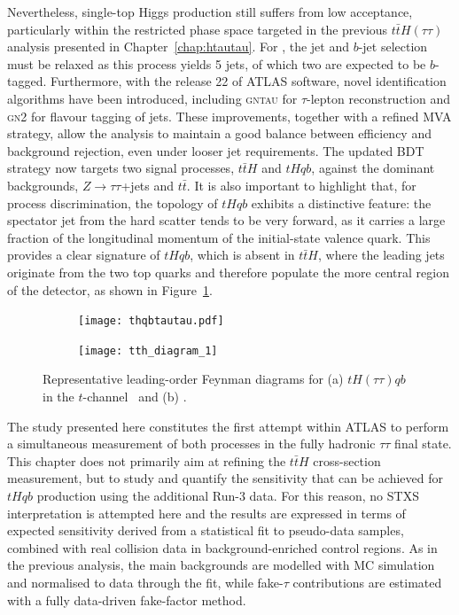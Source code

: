 Nevertheless, single-top Higgs production still suffers from low acceptance, particularly within the restricted phase space targeted in the previous $t\bar{t}H(\tau\tau)$ analysis presented in Chapter~\ref{chap:htautau}. 
For \thtt, the jet and $b$-jet selection must be relaxed as this process yields 5 jets, of which two are expected to be $b$-tagged. 
Furthermore, with the release 22 of ATLAS software, novel identification algorithms have been introduced, including \textsc{gntau} for $\tau$-lepton reconstruction and \textsc{gn2} for flavour tagging of jets. 
These improvements, together with a refined MVA strategy, allow the analysis to maintain a good balance between efficiency and background rejection, even under looser jet requirements. 
The updated BDT strategy now targets two signal processes, $t\bar{t}H$ and $tHqb$, against the dominant backgrounds, $Z\to\tau\tau$+jets and $t\bar{t}$. 
It is also important to highlight that, for process discrimination, the topology of $tHqb$ exhibits a distinctive feature: the spectator jet from the hard scatter tends to be very forward, as it carries a large fraction of the longitudinal momentum of the initial-state valence quark. This provides a clear signature of $tHqb$, which is absent in $t\bar{t}H$, where the leading jets originate from the two top quarks and therefore populate the more central region of the detector, as shown in Figure~\ref{fig:feynman_tH_ttH}.
\begin{figure}[htbp]
    \centering
    \begin{subfigure}[b]{0.37\textwidth}
      \centering
      \texttt{[image: thqbtautau.pdf]}
      \caption{}
    \end{subfigure}
    \begin{subfigure}[b]{0.4\textwidth}
      \centering
      \texttt{[image: tth\_diagram\_1]}
      \caption{}
    \end{subfigure}
    \caption{Representative leading-order Feynman diagrams for (a) $tH(\tau\tau)qb$ in the $t$-channel~\cite{Barger_2010} and (b) \ttHtt.}
    \label{fig:feynman_tH_ttH}
  \end{figure}

The study presented here constitutes the first attempt within ATLAS to perform a simultaneous measurement of both processes in the fully hadronic $\tau\tau$ final state. 
This chapter does not primarily aim at refining the $t\bar{t}H$ cross-section measurement, but to study and quantify the sensitivity that can be achieved for $tHqb$ production using the additional Run-3 data. 
For this reason, no STXS interpretation is attempted here and the results are expressed in terms of expected sensitivity derived from a statistical fit to pseudo-data samples, combined with real collision data in background-enriched control regions. 
As in the previous analysis, the main backgrounds are modelled with MC simulation and normalised to data through the fit, while fake-$\tau$ contributions are estimated with a fully data-driven fake-factor method. 

